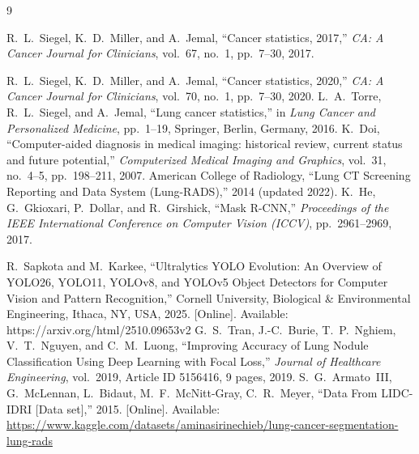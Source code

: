 \documentclass[conference]{IEEEtran}
\begin{document}
\begin{thebibliography}{9}




R.~L.~Siegel, K.~D.~Miller, and A.~Jemal,
``Cancer statistics, 2017,''
\textit{CA: A Cancer Journal for Clinicians},
vol.~67, no.~1, pp.~7--30, 2017.

R.~L.~Siegel, K.~D.~Miller, and A.~Jemal,
``Cancer statistics, 2020,''
\textit{CA: A Cancer Journal for Clinicians},
vol.~70, no.~1, pp.~7--30, 2020.
L.~A.~Torre, R.~L.~Siegel, and A.~Jemal,
``Lung cancer statistics,''
in \textit{Lung Cancer and Personalized Medicine},
pp.~1--19, Springer, Berlin, Germany, 2016.
K.~Doi,
``Computer-aided diagnosis in medical imaging: historical review, current status and future potential,''
\textit{Computerized Medical Imaging and Graphics},
vol.~31, no.~4--5, pp.~198--211, 2007.
American College of Radiology,
``Lung CT Screening Reporting and Data System (Lung-RADS),''
2014 (updated 2022).
K.~He, G.~Gkioxari, P.~Dollar, and R.~Girshick,
``Mask R-CNN,''
\textit{Proceedings of the IEEE International Conference on Computer Vision (ICCV)},
pp.~2961--2969, 2017.


R.~Sapkota and M.~Karkee,
``Ultralytics YOLO Evolution: An Overview of YOLO26, YOLO11, YOLOv8, and YOLOv5 Object Detectors for Computer Vision and Pattern Recognition,''
Cornell University, Biological \& Environmental Engineering, Ithaca, NY, USA, 2025. [Online]. Available: https://arxiv.org/html/2510.09653v2
G.~S.~Tran, J.-C.~Burie, T.~P.~Nghiem, V.~T.~Nguyen, and C.~M.~Luong,
``Improving Accuracy of Lung Nodule Classification Using Deep Learning with Focal Loss,''
\textit{Journal of Healthcare Engineering},
vol.~2019, Article ID 5156416, 9 pages, 2019.
S.~G.~Armato~III, G.~McLennan, L.~Bidaut, M.~F.~McNitt-Gray, C.~R.~Meyer,
``Data From LIDC-IDRI [Data set],''
2015. [Online]. Available: \url{https://www.kaggle.com/datasets/aminasirinechieb/lung-cancer-segmentation-lung-rads}



\end{thebibliography}
\end{document}
